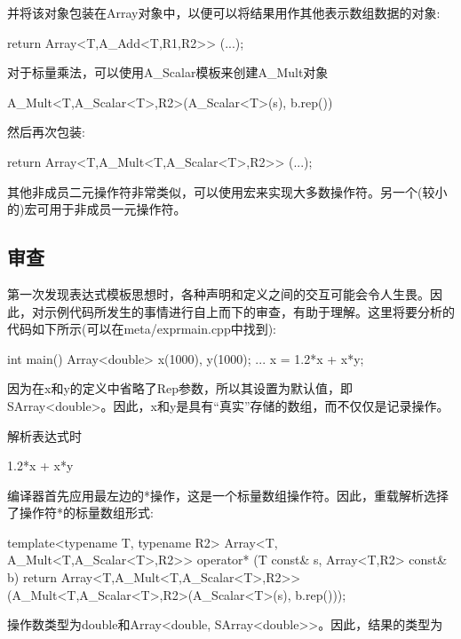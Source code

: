 并将该对象包装在Array对象中，以便可以将结果用作其他表示数组数据的对象:

\begin{cpp}
return Array<T,A_Add<T,R1,R2>> (...);
\end{cpp}

对于标量乘法，可以使用A\_Scalar模板来创建A\_Mult对象

\begin{cpp}
A_Mult<T,A_Scalar<T>,R2>(A_Scalar<T>(s), b.rep())
\end{cpp}

然后再次包装:

\begin{cpp}
return Array<T,A_Mult<T,A_Scalar<T>,R2>> (...);
\end{cpp}

其他非成员二元操作符非常类似，可以使用宏来实现大多数操作符。另一个(较小的)宏可用于非成员一元操作符。

\subsection{审查}

第一次发现表达式模板思想时，各种声明和定义之间的交互可能会令人生畏。因此，对示例代码所发生的事情进行自上而下的审查，有助于理解。这里将要分析的代码如下所示(可以在meta/exprmain.cpp中找到):

\begin{cpp}
int main()
{
	Array<double> x(1000), y(1000);
	...
	x = 1.2*x + x*y;
}
\end{cpp}

因为在x和y的定义中省略了Rep参数，所以其设置为默认值，即SArray<double>。因此，x和y是具有“真实”存储的数组，而不仅仅是记录操作。

解析表达式时

\begin{cpp}
1.2*x + x*y
\end{cpp}

编译器首先应用最左边的*操作，这是一个标量数组操作符。因此，重载解析选择了操作符*的标量数组形式:

\begin{cpp}
template<typename T, typename R2>
Array<T, A_Mult<T,A_Scalar<T>,R2>>
operator* (T const& s, Array<T,R2> const& b) {
	return Array<T,A_Mult<T,A_Scalar<T>,R2>>
		(A_Mult<T,A_Scalar<T>,R2>(A_Scalar<T>(s), b.rep()));
}
\end{cpp}

操作数类型为double和Array<double, SArray<double>{}>。因此，结果的类型为

